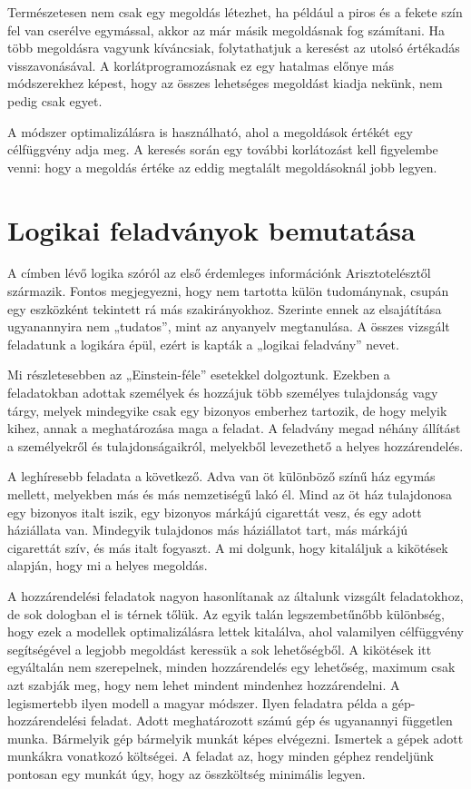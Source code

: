 \documentclass[12pt,a4paper]{report}
\begin{document}
    Természetesen nem csak egy megoldás létezhet, ha például a piros és a fekete szín fel van cserélve egymással, akkor az már másik megoldásnak fog számítani.
    Ha több megoldásra vagyunk kíváncsiak, folytathatjuk a keresést az utolsó értékadás visszavonásával.
    A korlátprogramozásnak ez egy hatalmas előnye más módszerekhez képest, hogy az összes lehetséges megoldást kiadja nekünk, nem pedig csak egyet.
    
    A módszer optimalizálásra is használható, ahol a megoldások értékét egy célfüggvény adja meg.
    A keresés során egy további korlátozást kell figyelembe venni: hogy a megoldás értéke az eddig megtalált megoldásoknál jobb legyen.


\section{Logikai feladványok bemutatása}

    A címben lévő logika szóról az első érdemleges információnk Arisztotelésztől származik.
    Fontos megjegyezni, hogy nem tartotta külön tudománynak, csupán egy eszközként tekintett rá más szakirányokhoz.
    Szerinte ennek az elsajátítása ugyanannyira nem „tudatos”, mint az anyanyelv megtanulása.\cite{logic}
    A összes vizsgált feladatunk a logikára épül, ezért is kapták a „logikai feladvány” nevet.
    
    Mi részletesebben az „Einstein-féle” esetekkel\cite{logicpuzzles} dolgoztunk.
    Ezekben a feladatokban adottak személyek és hozzájuk több személyes tulajdonság vagy tárgy, melyek mindegyike csak egy bizonyos emberhez tartozik, de hogy melyik kihez, annak a meghatározása maga a feladat.
    A feladvány megad néhány állítást a személyekről és tulajdonságaikról, melyekből levezethető a helyes hozzárendelés.
    
    A leghíresebb feladata a következő.
    Adva van öt különböző színű ház egymás mellett, melyekben más és más nemzetiségű lakó él.
    Mind az öt ház tulajdonosa egy bizonyos italt iszik, egy bizonyos márkájú cigarettát vesz, és egy adott háziállata van.
    Mindegyik tulajdonos más háziállatot tart, más márkájú cigarettát szív, és más italt fogyaszt.
    A mi dolgunk, hogy kitaláljuk a kikötések alapján, hogy mi a helyes megoldás.

    A hozzárendelési feladatok nagyon hasonlítanak az általunk vizsgált feladatokhoz, de sok dologban el is térnek tőlük.
    Az egyik talán legszembetűnőbb különbség, hogy ezek a modellek optimalizálásra lettek kitalálva, ahol valamilyen célfüggvény segítségével a legjobb megoldást keressük a sok lehetőségből.
    A kikötések itt egyáltalán nem szerepelnek, minden hozzárendelés egy lehetőség, maximum csak azt szabják meg, hogy nem lehet mindent mindenhez hozzárendelni.
    A legismertebb ilyen modell a magyar módszer\cite{magyarmodszer}.
    Ilyen feladatra példa a gép-hozzárendelési feladat.
    Adott meghatározott számú gép és ugyanannyi független munka.
    Bármelyik gép bármelyik munkát képes elvégezni.
    Ismertek a gépek adott munkákra vonatkozó költségei.
    A feladat az, hogy minden géphez rendeljünk pontosan egy munkát úgy, hogy az összköltség minimális legyen.
\end{document}
